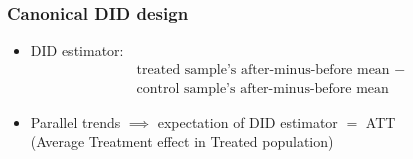 \documentclass[table, xcolor = {dvipsnames}, 9pt]{beamer}
\theoremstyle{plain}
\begin{document}
\begin{frame}[t]
\frametitle{Canonical DID design}
\vfill
\begin{itemize}
\item DID estimator: \pause 
\begin{align*}
\text{treated sample's after-minus-before mean } - \\ \text{control sample's after-minus-before mean} 
\end{align*} \vfill
\item \pause Parallel trends $\implies$ expectation of DID estimator $=$ ATT \\ 
\pause (Average Treatment effect in Treated population) \vfill
\end{itemize}
\vfill
\end{frame}
\end{document}
